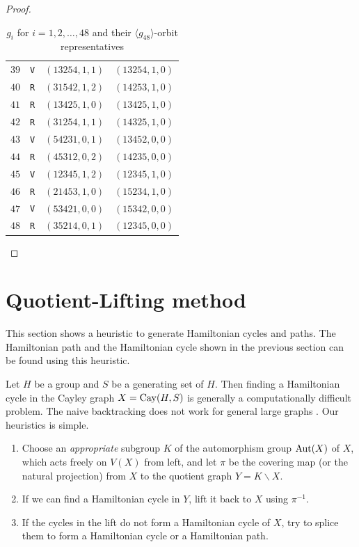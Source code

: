\documentclass[lualatex,11pt]{article}
\begin{document}
\begin{proof}
\begin{center}
\begin{table}[H]
\begin{center}
\begin{tabular}{c|c|c|c}
   $39$ &   {\tt V} &  $(13254,1,1)$ & $(13254,1,0)$\\
   $40$ &   {\tt R} &  $(31542,1,2)$ & $(14253,1,0)$\\
   $41$ &   {\tt R} &  $(13425,1,0)$ & $(13425,1,0)$\\
   $42$ &   {\tt R} &  $(31254,1,1)$ & $(14325,1,0)$\\
   $43$ &   {\tt V} &  $(54231,0,1)$ & $(13452,0,0)$\\
   $44$ &   {\tt R} &  $(45312,0,2)$ & $(14235,0,0)$\\
   $45$ &   {\tt V} &  $(12345,1,2)$ & $(12345,1,0)$\\
   $46$ &   {\tt R} &  $(21453,1,0)$ & $(15234,1,0)$\\
   $47$ &   {\tt V} &  $(53421,0,0)$ & $(15342,0,0)$\\
   $48$ &   {\tt R} &  $(35214,0,1)$ & $(12345,0,0)$\\
   \end{tabular}
  \end{center}
  \caption{$g_i$ for $i=1,2,\ldots, 48$ and their $\langle g_{48}\rangle$-orbit
  representatives}
  \label{tab:large}
 \end{table}
\end{center}
 
\end{proof}


\section{Quotient-Lifting method}
This section shows a heuristic to generate  
Hamiltonian cycles and paths.
The Hamiltonian path and the Hamiltonian cycle 
shown in the previous section
can be found using this heuristic.

Let $H$ be a group and $S$ be a generating set of $H$.
Then finding a Hamiltonian cycle in the Cayley graph $X={\rm Cay}(H, S)$
is generally a computationally difficult problem.
The naive backtracking does not work for general large graphs  \cite{ruskey1995hamiltonicity}.
Our heuristics is simple.

\begin{enumerate}
 \item Choose an {\em appropriate} subgroup $K$ of the automorphism group ${\rm Aut}(X)$
       of $X$, which acts freely on $V(X)$ from left,
       and let $\pi$ be the covering map  (or the natural projection)
       from $X$ to
       the quotient graph $Y=K\backslash X$.
 \item If we can find a Hamiltonian cycle in $Y$, lift it
       back to $X$ using $\pi^{-1}$.
 \item If the cycles in the lift  do not form a Hamiltonian cycle of $X$,
       try to splice them to form a Hamiltonian cycle or a Hamiltonian path.
\end{enumerate}
\end{document}

